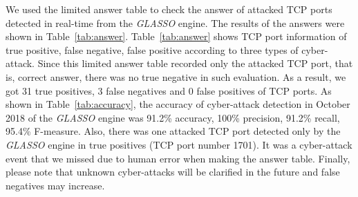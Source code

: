 \documentclass[conference]{IEEEtran}
\begin{document}
We used the limited answer table to check the answer of attacked TCP ports detected in real-time from the {\it GLASSO} engine.
The results of the answers were shown in Table~\ref{tab:answer}.
Table~\ref{tab:answer} shows TCP port information of true positive, false negative, false positive according to three types of cyber-attack.
Since this limited answer table recorded only the attacked TCP port, that is, correct answer, there was no true negative in such evaluation.
As a result, we got 31 true positives, 3 false negatives and 0 false positives of TCP ports.
As shown in Table~\ref{tab:accuracy}, the accuracy of cyber-attack detection in October 2018 of the {\it GLASSO} engine was 91.2\% accuracy, 100\% precision, 91.2\% recall, 95.4\% F-measure.
Also, there was one attacked TCP port detected only by the {\it GLASSO} engine in true positives (TCP port number 1701).
It was a cyber-attack event that we missed due to human error when making the answer table.
Finally, please note that unknown cyber-attacks will be clarified in the future and false negatives may increase.
\end{document}
